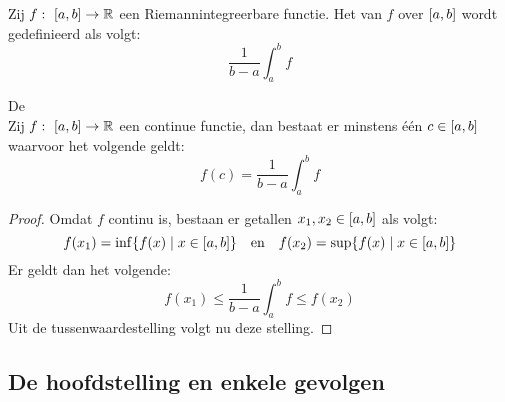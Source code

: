 \documentclass[main.tex]{subfiles}
\begin{document}
\begin{de}
  Zij $f:\ \interval{a}{b} \rightarrow \mathbb{R}$ een Riemannintegreerbare functie.
  Het  van $f$ over $\interval{a}{b}$ wordt gedefinieerd als volgt:
  \[ \frac{1}{b-a} \int_{a}^{b}f \]
\end{de}

\begin{bst}
  De \\
  Zij $f:\ \interval{a}{b} \rightarrow \mathbb{R}$ een continue functie, dan bestaat er minstens \'e\'en $c\in \interval{a}{b}$ waarvoor het volgende geldt:
  \[ f(c) = \frac{1}{b-a} \int_{a}^{b}f \]

  \begin{proof}
    Omdat $f$ continu is, bestaan er getallen $x_{1},x_{2}\in\interval{a}{b}$ als volgt:
    \[ f(x_{1}) = \inf\{f(x) \mid x\in\interval{a}{b}\} \quad\text{en}\quad f(x_{2}) = \sup\{f(x) \mid x\in\interval{a}{b}\} \]
    Er geldt dan het volgende:
    \[ f(x_{1}) \le \frac{1}{b-a} \int_{a}^{b}f \le f(x_{2}) \]
    Uit de tussenwaardestelling volgt nu deze stelling.\waarom
  \end{proof}
\end{bst}


\subsection{De hoofdstelling en enkele gevolgen}
\label{sec:de-hoofdstelling-en}
\end{document}
